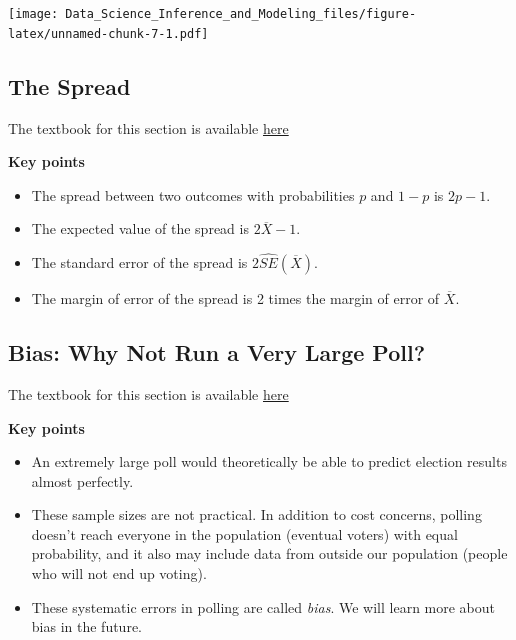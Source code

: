 \documentclass[
]{article}
\providecommand{\tightlist}{%
  \setlength{\itemsep}{0pt}\setlength{\parskip}{0pt}}
\begin{document}
\texttt{[image: Data\_Science\_Inference\_and\_Modeling\_files/figure-latex/unnamed-chunk-7-1.pdf]}

\hypertarget{the-spread}{%
\subsection{The Spread}\label{the-spread}}

The textbook for this section is available
\href{https://rafalab.github.io/dsbook/inference.html\#the-spread}{here}

\textbf{Key points}

\begin{itemize}
\tightlist
\item
  The spread between two outcomes with probabilities \(p\) and \(1 - p\)
  is \(2p - 1\).
\item
  The expected value of the spread is \(2 \overline{X} - 1\).
\item
  The standard error of the spread is \(2 \hat{SE}(\overline{X})\).
\item
  The margin of error of the spread is 2 times the margin of error of
  \(\overline{X}\).
\end{itemize}

\hypertarget{bias-why-not-run-a-very-large-poll}{%
\subsection{Bias: Why Not Run a Very Large
Poll?}\label{bias-why-not-run-a-very-large-poll}}

The textbook for this section is available
\href{https://rafalab.github.io/dsbook/inference.html\#bias-why-not-run-a-very-large-poll}{here}

\textbf{Key points}

\begin{itemize}
\tightlist
\item
  An extremely large poll would theoretically be able to predict
  election results almost perfectly.
\item
  These sample sizes are not practical. In addition to cost concerns,
  polling doesn't reach everyone in the population (eventual voters)
  with equal probability, and it also may include data from outside our
  population (people who will not end up voting).
\item
  These systematic errors in polling are called \emph{bias}. We will
  learn more about bias in the future.
\end{itemize}
\end{document}
